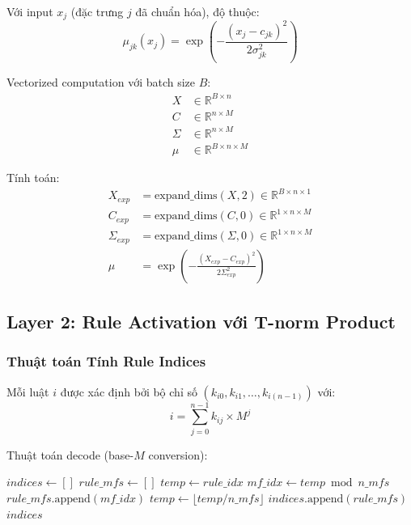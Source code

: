 \documentclass[12pt,a4paper]{article}
\begin{document}
Với input $x_j$ (đặc trưng $j$ đã chuẩn hóa), độ thuộc:
\begin{equation}
\mu_{jk}(x_j) = \exp\left(-\frac{(x_j - c_{jk})^2}{2\sigma_{jk}^2}\right)
\end{equation}

Vectorized computation với batch size $B$:
\begin{align}
X &\in \mathbb{R}^{B \times n} \\
C &\in \mathbb{R}^{n \times M} \\
\Sigma &\in \mathbb{R}^{n \times M} \\
\mu &\in \mathbb{R}^{B \times n \times M}
\end{align}

Tính toán:
\begin{align}
X_{exp} &= \text{expand\_dims}(X, 2) \in \mathbb{R}^{B \times n \times 1} \\
C_{exp} &= \text{expand\_dims}(C, 0) \in \mathbb{R}^{1 \times n \times M} \\
\Sigma_{exp} &= \text{expand\_dims}(\Sigma, 0) \in \mathbb{R}^{1 \times n \times M} \\
\mu &= \exp\left(-\frac{(X_{exp} - C_{exp})^2}{2\Sigma_{exp}^2}\right)
\end{align}

\subsection{Layer 2: Rule Activation với T-norm Product}

\subsubsection{Thuật toán Tính Rule Indices}

Mỗi luật $i$ được xác định bởi bộ chỉ số $(k_{i0}, k_{i1}, \ldots, k_{i(n-1)})$ với:
\begin{equation}
i = \sum_{j=0}^{n-1} k_{ij} \times M^j
\end{equation}

Thuật toán decode (base-$M$ conversion):
\begin{algorithmic}
    \State $indices \gets []$
        \State $rule\_mfs \gets []$
        \State $temp \gets rule\_idx$
            \State $mf\_idx \gets temp \bmod n\_mfs$
            \State $rule\_mfs.\text{append}(mf\_idx)$
            \State $temp \gets \lfloor temp / n\_mfs \rfloor$
        \EndFor
        \State $indices.\text{append}(rule\_mfs)$
    \EndFor
    \State \Return $indices$
\EndFunction
\end{algorithmic}
\end{document}
